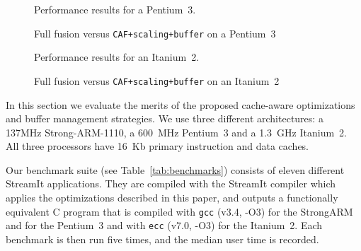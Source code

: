 \begin{figure*}
\begin{minipage}{3.4in}
\vspace{-36pt}
\hspace{-0.4in}
\vspace{-66pt}
\caption{Performance results for a Pentium~3.\protect\label{fig:p3-perf2}}
\end{minipage}
\hspace{0.1in}
\begin{minipage}{3.4in}
\vspace{-36pt}
\hspace{-0.4in}
\vspace{-66pt}
\caption{Full fusion versus \texttt{CAF+scaling+buffer} on a Pentium~3\protect\label{fig:p3-perf}}
\end{minipage}
\end{figure*}

\begin{figure*}
\begin{minipage}{3.4in}
\vspace{-36pt}
\hspace{-0.4in}
\vspace{-66pt}
\caption{Performance results for an Itanium~2.\protect\label{fig:i2-perf2}}
\end{minipage}
\hspace{0.1in}
\begin{minipage}{3.4in}
\vspace{-36pt}
\hspace{-0.4in}
\vspace{-66pt}
\caption{Full fusion versus \texttt{CAF+scaling+buffer} on an Itanium~2\protect\label{fig:i2-perf}}
\end{minipage}
\end{figure*}



In this section we evaluate the merits of the proposed cache-aware
optimizations and buffer management strategies. We use three
different architectures: a 137MHz Strong-ARM-1110, a 600~MHz Pentium~3 and 
a 1.3~GHz Itanium~2. All three processors have 16~Kb primary instruction and data caches.


Our benchmark suite (see Table~\ref{tab:benchmarks}) consists of eleven
different StreamIt applications. They are compiled with the StreamIt
compiler which applies the optimizations described in this paper, and
outputs a functionally equivalent C program that is compiled with
\texttt{gcc} (v3.4, -O3) for the StrongARM and for the Pentium~3 and with
\texttt{ecc} (v7.0, -O3) for the Itanium~2. Each benchmark is
then run five times, and the median user time is recorded.


